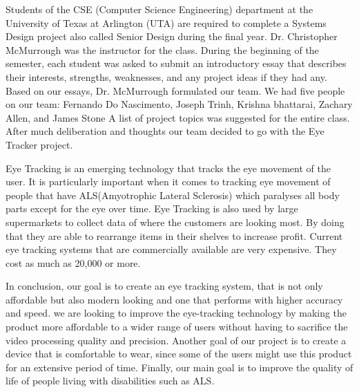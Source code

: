 Students of the CSE (Computer Science Engineering) department at the University of Texas at Arlington (UTA) are required to complete a Systems Design project also called \“Senior Design\” during the final year. Dr. Christopher McMurrough was the instructor for the class. During the beginning of the semester, each student was asked to submit an introductory essay that describes their interests, strengths, weaknesses, and any project ideas if they had any. Based on our essays, Dr. McMurrough formulated our team. We had five people on our team: Fernando Do Nascimento, Joseph Trinh, Krishna bhattarai, Zachary Allen, and James Stone
A list of project topics was suggested for the entire class. After much deliberation and thoughts our team decided to go with the Eye Tracker project.

Eye Tracking is an emerging technology that tracks the eye movement of the user. It is particularly important when it comes to tracking eye movement of people that have ALS(Amyotrophic Lateral Sclerosis) which paralyses all body parts except for the eye over time. Eye Tracking is also used by large supermarkets to collect data of where the customers are looking most. By doing that they are able to rearrange items in their shelves to increase profit. Current eye tracking systems that are commercially available are very expensive. They cost as much as 20,000 or more. 

In conclusion, our goal is to create an eye tracking system, that is not only affordable but also modern looking and one that performs with higher accuracy and speed. we are looking to improve the eye-tracking technology by making the product more affordable to a wider range of users without having to sacrifice the video processing quality and precision. Another goal of our project is to create a device that is comfortable to wear, since some of the users might use this product for an extensive period of time. Finally, our main goal is to improve the quality of life of people living with disabilities such as ALS.


